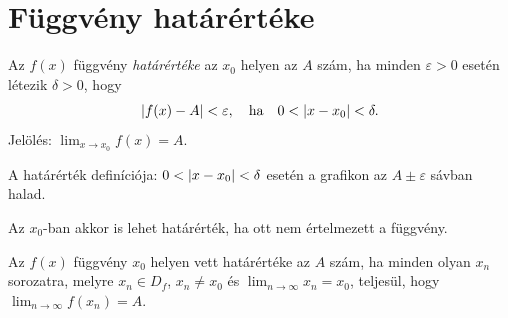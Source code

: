 \documentclass[11pt]{article}
\begin{document}
\section{Függvény határértéke}

\begin{defbox}
\begin{definition}
Az $f(x)$ függvény \emph{határértéke} az $x_{0}$ helyen az $A$ szám, ha minden $\varepsilon>0$ esetén létezik $\delta>0$, hogy
\[
\left|f(x)-A\right|<\varepsilon,\quad\text{ha}\quad 0<\left|x-x_{0}\right|<\delta .
\]
Jelölés: $\displaystyle\lim_{x\to x_{0}}f(x)=A$.
\end{definition}
\end{defbox}

\begin{notefig}{A határérték definíciója: $0<\left|x-x_{0}\right|<\delta$ esetén a grafikon az $A\pm\varepsilon$ sávban halad.}
\end{notefig}

\begin{remark}
Az $x_{0}$-ban akkor is lehet határérték, ha ott nem értelmezett a függvény.
\end{remark}

\begin{defbox}
\begin{definition}
Az $f(x)$ függvény $x_{0}$ helyen vett határértéke az $A$ szám, ha minden olyan $x_{n}$ sorozatra, melyre $x_{n}\in D_{f}$, $x_{n}\neq x_{0}$ és $\displaystyle\lim_{n\to\infty}x_{n}=x_{0}$, teljesül, hogy $\displaystyle\lim_{n\to\infty}f(x_{n})=A$.
\end{definition}
\end{defbox}
\end{document}
